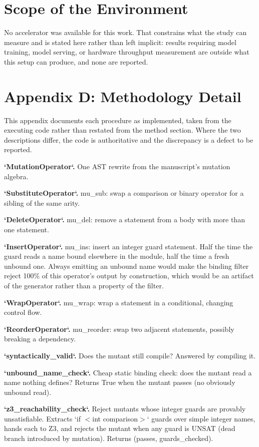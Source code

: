 \documentclass[10pt,journal,compsoc,twocolumn]{IEEEtran}
\begin{document}
\section{Scope of the Environment}


No accelerator was available for this work. That constrains what the study can measure and is stated here rather than left implicit: results requiring model training, model serving, or hardware throughput measurement are outside what this setup can produce, and none are reported.




\section{Appendix D: Methodology Detail}


This appendix documents each procedure as implemented, taken from the executing code rather than restated from the method section. Where the two descriptions differ, the code is authoritative and the discrepancy is a defect to be reported.

\textbf{`MutationOperator`.} One AST rewrite from the manuscript's mutation algebra.

\textbf{`SubstituteOperator`.} mu\_sub: swap a comparison or binary operator for a sibling of the same arity.

\textbf{`DeleteOperator`.} mu\_del: remove a statement from a body with more than one statement.

\textbf{`InsertOperator`.} mu\_ins: insert an integer guard statement. Half the time the guard reads a name bound elsewhere in the module, half the time a fresh unbound one. Always emitting an unbound name would make the binding filter reject 100\% of this operator's output by construction, which would be an artifact of the generator rather than a property of the filter.

\textbf{`WrapOperator`.} mu\_wrap: wrap a statement in a conditional, changing control flow.

\textbf{`ReorderOperator`.} mu\_reorder: swap two adjacent statements, possibly breaking a dependency.

\textbf{`syntactically\_valid`.} Does the mutant still compile? Answered by compiling it.

\textbf{`unbound\_name\_check`.} Cheap static binding check: does the mutant read a name nothing defines? Returns True when the mutant passes (no obviously unbound read).

\textbf{`z3\_reachability\_check`.} Reject mutants whose integer guards are provably unsatisfiable. Extracts `if $<$int comparison$>$` guards over simple integer names, hands each to Z3, and rejects the mutant when any guard is UNSAT (dead branch introduced by mutation). Returns (passes, guards\_checked).
\end{document}
